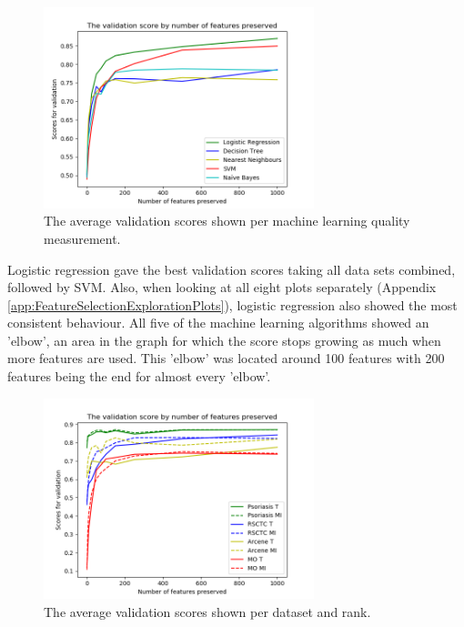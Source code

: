\documentclass[10pt,a4paper]{article}
\begin{document}
	\begin{figure}[H]
		\includegraphics[width=0.7\textwidth]{Machine_Learning_Val_Scores.png}
		\caption{The average validation scores shown per machine learning quality measurement.}
		\label{fig:MachineLearningQualityScores}
	\end{figure}

	Logistic regression gave the best validation scores taking all data sets combined, followed by SVM. Also, when looking at all eight plots separately (Appendix \ref{app:FeatureSelectionExplorationPlots}), logistic regression also showed the most consistent behaviour. All five of the machine learning algorithms showed an 'elbow', an area in the graph for which the score stops growing as much when more features are used. This 'elbow' was located around 100 features with 200 features being the end for almost every 'elbow'.

	\begin{figure}[H]
		\includegraphics[width=0.7\textwidth]{Data_Rank_Val_Scores.png}
		\caption{The average validation scores shown per dataset and rank.}
		\label{fig:DatasetRankScores}
	\end{figure}
	
\end{document}
